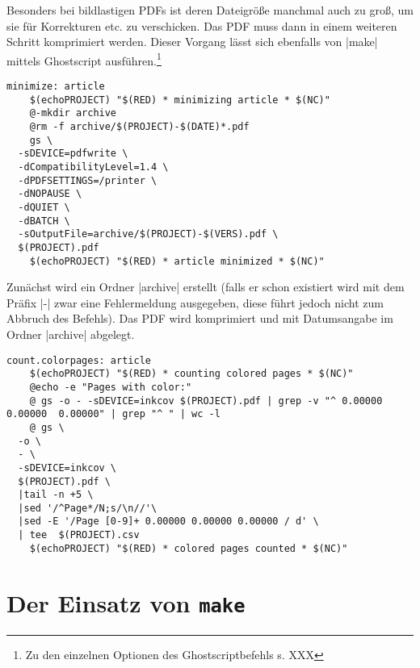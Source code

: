 \documentclass[ngerman]{dtk}
\begin{document}
Besonders bei bildlastigen PDFs ist deren Dateigröße manchmal auch zu groß,
um sie für Korrekturen etc. zu verschicken.
Das PDF muss dann in einem weiteren Schritt komprimiert werden.
Dieser Vorgang lässt sich ebenfalls von |make| mittels Ghostscript ausführen.\footnote{Zu den einzelnen Optionen des Ghostscriptbefehls s. XXX}

\begin{lstlisting}[style=number]
minimize: article
	$(echoPROJECT) "$(RED) * minimizing article * $(NC)"
	@-mkdir archive
	@rm -f archive/$(PROJECT)-$(DATE)*.pdf
	gs \
  -sDEVICE=pdfwrite \
  -dCompatibilityLevel=1.4 \
  -dPDFSETTINGS=/printer \
  -dNOPAUSE \
  -dQUIET \
  -dBATCH \
  -sOutputFile=archive/$(PROJECT)-$(VERS).pdf \
  $(PROJECT).pdf
	$(echoPROJECT) "$(RED) * article minimized * $(NC)"
\end{lstlisting}
Zunächst wird ein Ordner |archive| erstellt (falls er schon existiert wird mit dem Präfix |-| zwar eine Fehlermeldung ausgegeben, diese führt jedoch nicht zum Abbruch des Befehls). Das PDF wird komprimiert und mit Datumsangabe im Ordner |archive| abgelegt.

\begin{lstlisting}[style=number]
count.colorpages: article
	$(echoPROJECT) "$(RED) * counting colored pages * $(NC)"
	@echo -e "Pages with color:"
	@ gs -o - -sDEVICE=inkcov $(PROJECT).pdf | grep -v "^ 0.00000  0.00000  0.00000" | grep "^ " | wc -l
	@ gs \
  -o \
  - \
  -sDEVICE=inkcov \
  $(PROJECT).pdf \
  |tail -n +5 \
  |sed '/^Page*/N;s/\n//'\
  |sed -E '/Page [0-9]+ 0.00000 0.00000 0.00000 / d' \
  | tee  $(PROJECT).csv
	$(echoPROJECT) "$(RED) * colored pages counted * $(NC)"
\end{lstlisting}


\section{Der Einsatz von \texttt{make}}
\end{document}
